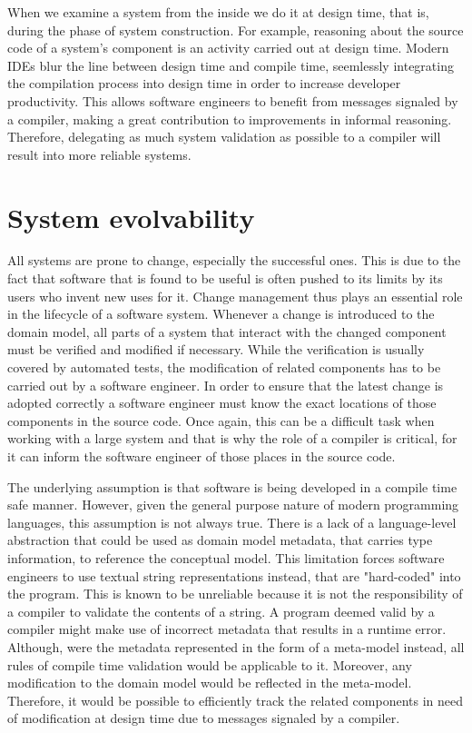 \n

When we examine a system from the inside we do it at design time, that is, during the phase of system construction.
For example, reasoning about the source code of a system's component is an activity carried out at design time.
Modern IDEs blur the line between design time and compile time, seemlessly integrating the compilation process into design time in order to increase developer productivity.
This allows software engineers to benefit from messages signaled by a compiler, making a great contribution to improvements in informal reasoning.
Therefore, delegating as much system validation as possible to a compiler will result into more reliable systems.

\section{System evolvability}
All systems are prone to change, especially the successful ones.
This is due to the fact that software that is found to be useful is often pushed to its limits by its users who invent new uses for it.
Change management thus plays an essential role in the lifecycle of a software system.
Whenever a change is introduced to the domain model, all parts of a system that interact with the changed component must be verified and modified if necessary.
While the verification is usually covered by automated tests, the modification of related components has to be carried out by a software engineer.
In order to ensure that the latest change is adopted correctly a software engineer must know the exact locations of those components in the source code.
Once again, this can be a difficult task when working with a large system and that is why the role of a compiler is critical, for it can inform the software engineer of those places in the source code.

\n

The underlying assumption is that software is being developed in a compile time safe manner.
However, given the general purpose nature of modern programming languages, this assumption is not always true.
There is a lack of a language-level abstraction that could be used as domain model metadata, that carries type information, to reference the conceptual model.
This limitation forces software engineers to use textual string representations instead, that are "hard-coded" into the program.
This is known to be unreliable because it is not the responsibility of a compiler to validate the contents of a string. A program deemed valid by a compiler might make use of incorrect metadata that results in a runtime error.
Although, were the metadata represented in the form of a meta-model instead, all rules of compile time validation would be applicable to it.
Moreover, any modification to the domain model would be reflected in the meta-model.
Therefore, it would be possible to efficiently track the related components in need of modification at design time due to messages signaled by a compiler.

